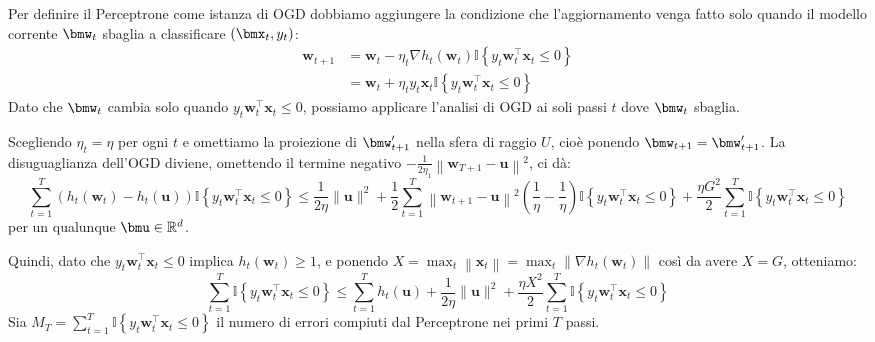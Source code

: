 \documentclass[\main/main.tex]{subfiles}
\begin{document}
\begin{analysis}
    Per definire il Perceptrone come istanza di OGD dobbiamo aggiungere la condizione che l'aggiornamento venga fatto solo quando il modello corrente \(\bmw_t\) sbaglia a classificare \(\rnd{\bmx_t, y_t}\):
    \begin{align*}
        \boldsymbol{w}_{t+1}&=\boldsymbol{w}_{t}-\eta_{t} \nabla h_{t}\left(\boldsymbol{w}_{t}\right) \mathbb{I}\left\{y_{t} \boldsymbol{w}_{t}^{\top} \boldsymbol{x}_{t} \leq 0\right\}\\&=\boldsymbol{w}_{t}+\eta_{t} y_{t} \boldsymbol{x}_{t} \mathbb{I}\left\{y_{t} \boldsymbol{w}_{t}^{\top} \boldsymbol{x}_{t} \leq 0\right\}
    \end{align*}
    Dato che \(\bmw_t\) cambia solo quando \(y_{t} \boldsymbol{w}_{t}^{\top} \boldsymbol{x}_{t} \leq 0\), possiamo applicare l'analisi di OGD ai soli passi \(t\) dove \(\bmw_t\) sbaglia.
    
    Scegliendo \(\eta_t = \eta\) per ogni \(t\) e omettiamo la proiezione di \(\bmw'_{t+1}\) nella sfera di raggio \(U\), cioè ponendo \(\bmw_{t+1} = \bmw'_{t+1}\). La disuguaglianza dell'OGD diviene, omettendo il termine negativo \(-\frac{1}{2 \eta_{1}}\left\|\boldsymbol{w}_{T+1}-\boldsymbol{u}\right\|^{2}\), ci dà:
    \[
        \sum_{t=1}^{T}\left(h_{t}\left(\boldsymbol{w}_{t}\right)-h_{t}(\boldsymbol{u})\right) \mathbb{I}\left\{y_{t} \boldsymbol{w}_{t}^{\top} \boldsymbol{x}_{t} \leq 0\right\} \leq \frac{1}{2 \eta}\|\boldsymbol{u}\|^{2} +\frac{1}{2} \sum_{t=1}^{T}\left\|\boldsymbol{w}_{t+1}-\boldsymbol{u}\right\|^{2}\left(\frac{1}{\eta}-\frac{1}{\eta}\right) \mathbb{I}\left\{y_{t} \boldsymbol{w}_{t}^{\top} \boldsymbol{x}_{t} \leq 0\right\}+\frac{\eta G^{2}}{2} \sum_{t=1}^{T} \mathbb{I}\left\{y_{t} \boldsymbol{w}_{t}^{\top} \boldsymbol{x}_{t} \leq 0\right\}
    \]
    per un qualunque \(\bmu \in \R^d\).
    
    Quindi, dato che \(y_{t} \boldsymbol{w}_{t}^{\top} \boldsymbol{x}_{t} \leq 0\) implica \(h_{t}\left(\boldsymbol{w}_{t}\right) \geq 1\), e ponendo \(X=\max _{t}\left\|\boldsymbol{x}_{t}\right\|=\max _{t}\left\|\nabla h_{t}\left(\boldsymbol{w}_{t}\right)\right\|\) così da avere \(X = G\), otteniamo:
    \[
        \sum_{t=1}^{T} \mathbb{I}\left\{y_{t} \boldsymbol{w}_{t}^{\top} \boldsymbol{x}_{t} \leq 0\right\} \leq \sum_{t=1}^{T} h_{t}(\boldsymbol{u})+\frac{1}{2 \eta}\|\boldsymbol{u}\|^{2}+\frac{\eta X^{2}}{2} \sum_{t=1}^{T} \mathbb{I}\left\{y_{t} \boldsymbol{w}_{t}^{\top} \boldsymbol{x}_{t} \leq 0\right\}
    \]
    Sia \(M_{T}=\sum_{t=1}^{T} \mathbb{I}\left\{y_{t} \boldsymbol{w}_{t}^{\top} \boldsymbol{x}_{t} \leq 0\right\}\) il numero di errori compiuti dal Perceptrone nei primi \(T\) passi.
    

\end{analysis}
\end{document}

